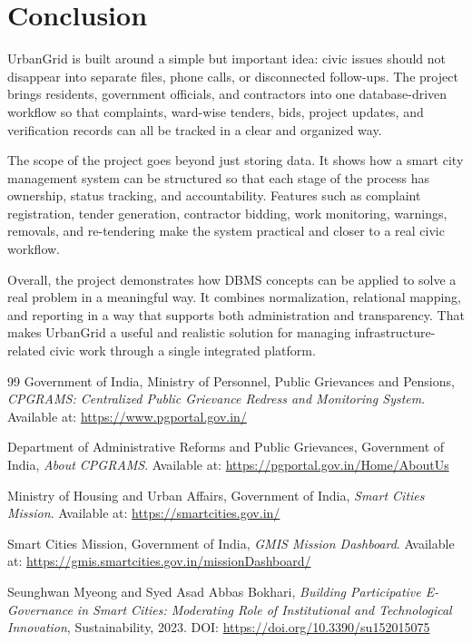 \documentclass[12pt,a4paper,oneside,openany]{report}
\begin{document}
\chapter*{Conclusion}
{}
UrbanGrid is built around a simple but important idea: civic issues should not disappear into separate files, phone calls, or disconnected follow-ups. The project brings residents, government officials, and contractors into one database-driven workflow so that complaints, ward-wise tenders, bids, project updates, and verification records can all be tracked in a clear and organized way.

The scope of the project goes beyond just storing data. It shows how a smart city management system can be structured so that each stage of the process has ownership, status tracking, and accountability. Features such as complaint registration, tender generation, contractor bidding, work monitoring, warnings, removals, and re-tendering make the system practical and closer to a real civic workflow.

Overall, the project demonstrates how DBMS concepts can be applied to solve a real problem in a meaningful way. It combines normalization, relational mapping, and reporting in a way that supports both administration and transparency. That makes UrbanGrid a useful and realistic solution for managing infrastructure-related civic work through a single integrated platform.




\begin{thebibliography}{99}
Government of India, Ministry of Personnel, Public Grievances and Pensions, \textit{CPGRAMS: Centralized Public Grievance Redress and Monitoring System}. Available at:
\url{https://www.pgportal.gov.in/}

Department of Administrative Reforms and Public Grievances, Government of India, \textit{About CPGRAMS}. Available at:
\url{https://pgportal.gov.in/Home/AboutUs}

Ministry of Housing and Urban Affairs, Government of India, \textit{Smart Cities Mission}. Available at:
\url{https://smartcities.gov.in/}

Smart Cities Mission, Government of India, \textit{GMIS Mission Dashboard}. Available at:
\url{https://gmis.smartcities.gov.in/missionDashboard/}

Seunghwan Myeong and Syed Asad Abbas Bokhari, \textit{Building Participative E-Governance in Smart Cities: Moderating Role of Institutional and Technological Innovation}, Sustainability, 2023. DOI:
\url{https://doi.org/10.3390/su152015075}



\end{thebibliography}
\end{document}
